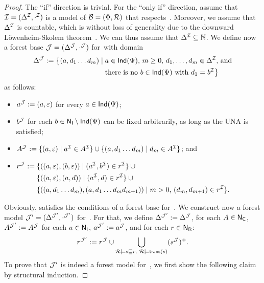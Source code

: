 \begin{proof}
    The \enquote{if} direction is trivial.  For the \enquote{only if} direction,
    assume that $\mathcal{I}=(\Delta^\mathcal{I},\cdot^\mathcal{I})$ is a model of
    $\mathcal{B}=(\Phi,\mathcal{R})$ that respects~\Dmc.
    Moreover, we assume that $\Delta^\mathcal{I}$ is countable, which is without loss
    of generality due to the downward Löwenheim-Skolem
    theorem~\cite{Loe-MA15,Sko-VS20}.  We can thus assume that
    $\Delta^\mathcal{I}\subseteq\mathbb{N}$.
    We define now a forest base $\mathcal{J}=(\Delta^\mathcal{J},\cdot^\mathcal{J})$ for~\Bmc with
    domain
    \begin{align*}
        \Delta^\mathcal{J}:=\bigl\{(a,d_1\dots d_m)\mid{}
            &\text{$a\in\mathsf{Ind}(\Psi)$, $m\ge 0$, $d_1,\dots,d_m\in\Delta^\mathcal{I}$, and}\\
            &\text{there is no $b\in\mathsf{Ind}(\Psi)$ with $d_1=b^\mathcal{I}$}\bigr\}
    \end{align*}
    as follows:
    \begin{itemize}
        \item $a^\mathcal{J}:=(a,\varepsilon)$ for every $a\in\mathsf{Ind}(\Psi)$;
        \item $b^\mathcal{J}$ for each $b\in\mathsf{N_I}\setminus\mathsf{Ind}(\Psi)$ can be fixed
            arbitrarily, as long as the UNA is satisfied;
        \item $A^\Jmc:=\{(a,\varepsilon)\mid a^\Imc\in A^\Imc\}\cup%
            \{(a,d_1\dots d_m)\mid d_m\in A^\Imc\}$; and
        \item $\displaystyle\begin{aligned}[t]
                r^\mathcal{J}:={}
                &\{((a,\varepsilon),(b,\varepsilon))\mid(a^\mathcal{I},b^\mathcal{I})\in r^\mathcal{I}\}\cup{}\\
                &\{((a,\varepsilon),(a,d))\mid(a^\mathcal{I},d)\in r^\mathcal{I}\}\cup{}\\
                &\{((a,d_1\dots d_m),(a,d_1\dots d_md_{m+1}))\mid\text{$m>0$, $(d_m,d_{m+1})\in r^\mathcal{I}$}\}.
            \end{aligned}$
    \end{itemize}
    Obviously, \Jmc satisfies the conditions of a forest base for~\Bmc.  We
    construct now a forest model $\mathcal{J}'=(\Delta^{\mathcal{J}'},\cdot^{\mathcal{J}'})$
    for~\Bmc.  For that, we define $\Delta^{\mathcal{J}'}:=\Delta^\mathcal{J}$, for each
    $A\in\mathsf{N_C}$, $A^{\mathcal{J}'}:=A^\mathcal{J}$ for each $a\in\mathsf{N_I}$, $a^{\mathcal{J}'}:=a^\mathcal{J}$, and
    for each $r\in\mathsf{N_R}$:
    \[r^{\mathcal{J}'}:=r^\mathcal{J}\cup\bigcup_{\mathcal{R}\models s\sqsubseteq r,\ \mathcal{R}\models\mathsf{trans}(s)}(s^\mathcal{J})^+.\]
    To prove that $\mathcal{J}'$ is indeed a forest model for~\Bmc, we first show the
    following claim by structural induction.


\end{proof}
